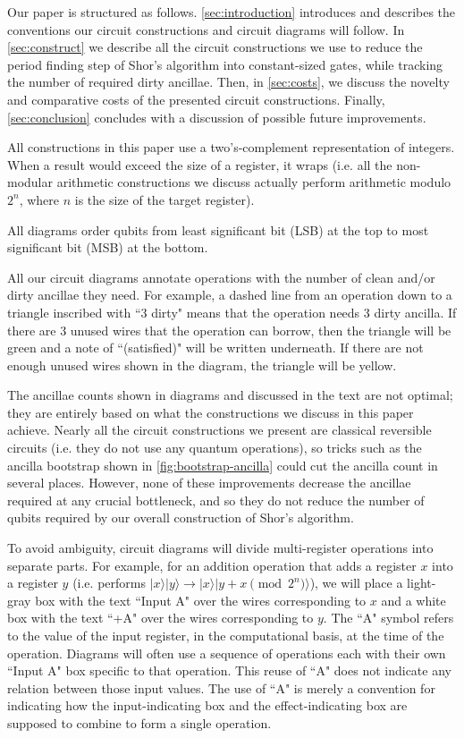 \documentclass[twocolumn,longbibliography]{quantumarticle-customized}
\begin{document}
Our paper is structured as follows.
\autoref{sec:introduction} introduces and describes the conventions our circuit constructions and circuit diagrams will follow.
In \autoref{sec:construct} we describe all the circuit constructions we use to reduce the period finding step of Shor's algorithm into constant-sized gates, while tracking the number of required dirty ancillae.
Then, in \autoref{sec:costs}, we discuss the novelty and comparative costs of the presented circuit constructions.
Finally, \autoref{sec:conclusion} concludes with a discussion of possible future improvements.

All constructions in this paper use a two's-complement representation of integers.
When a result would exceed the size of a register, it wraps (i.e. all the non-modular arithmetic constructions we discuss actually perform arithmetic modulo $2^n$, where $n$ is the size of the target register).

All diagrams order qubits from least significant bit (LSB) at the top to most significant bit (MSB) at the bottom.

All our circuit diagrams annotate operations with the number of clean and/or dirty ancillae they need.
For example, a dashed line from an operation down to a triangle inscribed with ``3 dirty" means that the operation needs 3 dirty ancilla.
If there are 3 unused wires that the operation can borrow, then the triangle will be green and a note of ``(satisfied)" will be written underneath.
If there are not enough unused wires shown in the diagram, the triangle will be yellow.

The ancillae counts shown in diagrams and discussed in the text are not optimal; they are entirely based on what the constructions we discuss in this paper achieve.
Nearly all the circuit constructions we present are classical reversible circuits (i.e. they do not use any quantum operations), so tricks such as the ancilla bootstrap shown in \autoref{fig:bootstrap-ancilla} could cut the ancilla count in several places.
However, none of these improvements decrease the ancillae required at any crucial bottleneck, and so they do not reduce the number of qubits required by our overall construction of Shor's algorithm.

To avoid ambiguity, circuit diagrams will divide multi-register operations into separate parts.
For example, for an addition operation that adds a register $x$ into a register $y$ (i.e. performs $|x\rangle |y\rangle \rightarrow |x\rangle |y + x \pmod{2^n} \rangle$), we will place a light-gray box with the text ``Input A" over the wires corresponding to $x$ and a white box with the text ``+A" over the wires corresponding to $y$.
The ``A" symbol refers to the value of the input register, in the computational basis, at the time of the operation.
Diagrams will often use a sequence of operations each with their own ``Input A" box specific to that operation.
This reuse of ``A" does not indicate any relation between those input values.
The use of ``A" is merely a convention for indicating how the input-indicating box and the effect-indicating box are supposed to combine to form a single operation.
\end{document}
